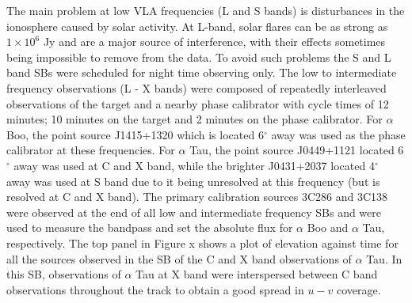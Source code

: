 The main problem at low VLA frequencies (L and S bands) is disturbances in the ionosphere caused by solar activity. At L-band, solar flares can be as strong as $1 \times 10^6$ Jy and are a major source of interference, with their effects sometimes being impossible to remove from the data. To avoid such problems the S and L band SBs were scheduled for night time observing only. The low to intermediate frequency observations (L - X bands) were composed of repeatedly interleaved observations of the target and a nearby phase calibrator with cycle times of 12 minutes; 10 minutes on the target and 2 minutes on the phase calibrator. For $\alpha$ Boo, the point source J1415+1320 which is located 6$^{\circ}$ away was used as the phase calibrator at these frequencies. For $\alpha$ Tau, the point source J0449+1121 located 6$^{\circ}$ away was used at C and X band, while the brighter J0431+2037 located 4$^{\circ}$ away was used at S band due to it being unresolved at this frequency (but is resolved at C and X band). The primary calibration sources 3C286 and 3C138 were observed at the end of all low and intermediate frequency SBs and were used to measure the bandpass and set the absolute flux for $\alpha$ Boo and $\alpha$ Tau, respectively. The top panel in Figure x shows a plot of elevation against time for all the sources observed in the SB of the C and X band observations of $\alpha$ Tau. In this SB, observations of $\alpha$ Tau at X band were interspersed between C band observations throughout the track to obtain a good spread in $u-v$ coverage. 

